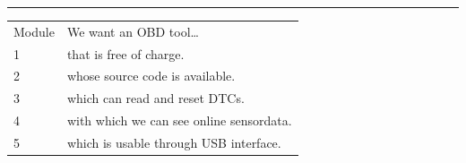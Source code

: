 {}

\begin{center}\rule{0.5\linewidth}{\linethickness}\end{center}

{}

{}

\href{}{}\href{}{}

\begin{longtable}[]{@{}ll@{}}
\toprule
\begin{minipage}[t]{0.47\columnwidth}\raggedright\strut
{Module}
\strut\end{minipage} &
\begin{minipage}[t]{0.47\columnwidth}\raggedright\strut
{We want an OBD tool\ldots{}}
\strut\end{minipage}\tabularnewline
\begin{minipage}[t]{0.47\columnwidth}\raggedright\strut
{1}
\strut\end{minipage} &
\begin{minipage}[t]{0.47\columnwidth}\raggedright\strut
{that is free of charge.}
\strut\end{minipage}\tabularnewline
\begin{minipage}[t]{0.47\columnwidth}\raggedright\strut
{2}
\strut\end{minipage} &
\begin{minipage}[t]{0.47\columnwidth}\raggedright\strut
{whose source code is available.}
\strut\end{minipage}\tabularnewline
\begin{minipage}[t]{0.47\columnwidth}\raggedright\strut
{3}
\strut\end{minipage} &
\begin{minipage}[t]{0.47\columnwidth}\raggedright\strut
{which can read and reset DTCs.}
\strut\end{minipage}\tabularnewline
\begin{minipage}[t]{0.47\columnwidth}\raggedright\strut
{4}
\strut\end{minipage} &
\begin{minipage}[t]{0.47\columnwidth}\raggedright\strut
{with which we can see online sensordata.}
\strut\end{minipage}\tabularnewline
\begin{minipage}[t]{0.47\columnwidth}\raggedright\strut
{5}
\strut\end{minipage} &
\begin{minipage}[t]{0.47\columnwidth}\raggedright\strut
{which is usable through USB interface.}

\end{minipage}
\end{longtable}
